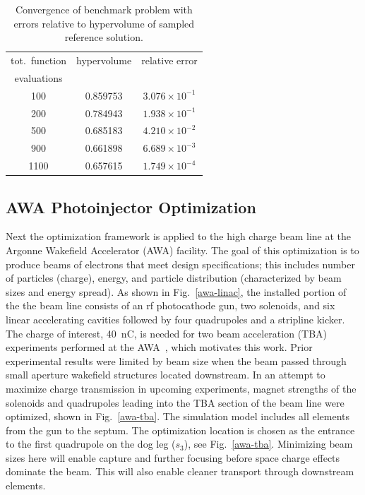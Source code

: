\begin{table}%
\begin{center}
  \caption{Convergence of benchmark problem with errors relative to
    hypervolume of sampled reference solution.}
  \label{tbl:bench_rms_error}
  \begin{tabular}{c|c|c}
	\cline{1-3}
    tot.\ function  & hypervolume & relative error\\
    evaluations    & & \\
	\cline{1-3}
    100  &  0.859753 & $3.076 \times 10^{-1}$ \\
    200  &  0.784943 & $1.938 \times 10^{-1}$ \\
    500  &  0.685183 & $4.210 \times 10^{-2}$ \\
    900  &  0.661898 & $6.689 \times 10^{-3}$ \\
    1100 &  0.657615 & $1.749 \times 10^{-4}$ \\
	\cline{1-3}
  \end{tabular}
\end{center}
\end{table}




\subsection{AWA Photoinjector Optimization} \label{awaproblem}
Next the optimization framework is applied to the high charge beam line
 at the Argonne Wakefield Accelerator (AWA) facility. 
The goal of this optimization is to produce beams of electrons that meet 
design specifications; this includes number of particles (charge), energy, 
and particle distribution (characterized by beam sizes and energy spread).
As shown in Fig.~\ref{awa-linac}, the installed portion of the the 
beam line consists of an rf photocathode gun, 
two solenoids, and six linear accelerating cavities
followed by four quadrupoles and a stripline kicker. 
The charge of interest, \SI{40}{nC}, is needed for two beam acceleration (TBA) 
experiments performed at the AWA~\cite{gai_power_jing_2012,JING201872}, 
which motivates this work. 
Prior experimental results were limited by beam size when the beam passed through small aperture 
wakefield structures located downstream. 
In an attempt to maximize charge transmission in upcoming experiments,
magnet strengths of the solenoids and quadrupoles leading into the 
TBA section of the beam line were optimized, shown in Fig.~\ref{awa-tba}.
The simulation model includes all elements from the gun to the septum.
The optimization location is chosen as the  
entrance to the first quadrupole on the dog leg ($s_3$), see Fig.~\ref{awa-tba}.
Minimizing beam sizes here will enable capture and further focusing before space charge effects dominate the beam. 
This will also enable cleaner transport through downstream elements.

